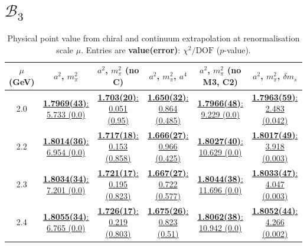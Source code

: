 \documentclass[12pt]{extarticle}
\begin{document}
\section{$\mathcal{B}_3$}
\begin{table}[h!]
\begin{center}
\begin{tabular}{|c|c|c|c|c|c|}
\hline
$\mu$ (GeV) & $a^2$, $m_\pi^2$& $a^2$, $m_\pi^2$ (no C)& $a^2$, $m_\pi^2$, $a^4$& $a^2$, $m_\pi^2$ (no M3, C2)& $a^2$, $m_\pi^2$, $\delta m_s$\\
\hline
2.0& \hyperlink{SSmPP/NPR/bag_a2m2_20.pdf.1}{\textbf{1.7969(43)}: 5.733 (0.0)} & \hyperlink{SSmPP/NPR/bag_a2m2noC_20.pdf.1}{\textbf{1.703(20)}: 0.051 (0.95)} & \hyperlink{SSmPP/NPR/bag_a2a4m2_20.pdf.1}{\textbf{1.650(32)}: 0.864 (0.485)} & \hyperlink{SSmPP/NPR/bag_a2m2mcut_20.pdf.1}{\textbf{1.7966(48)}: 9.229 (0.0)} & \hyperlink{SSmPP/NPR/bag_a2m2delm_20.pdf.1}{\textbf{1.7963(59)}: 2.483 (0.042)}\\
2.2& \hyperlink{SSmPP/NPR/bag_a2m2_22.pdf.1}{\textbf{1.8014(36)}: 6.954 (0.0)} & \hyperlink{SSmPP/NPR/bag_a2m2noC_22.pdf.1}{\textbf{1.717(18)}: 0.153 (0.858)} & \hyperlink{SSmPP/NPR/bag_a2a4m2_22.pdf.1}{\textbf{1.666(27)}: 0.966 (0.425)} & \hyperlink{SSmPP/NPR/bag_a2m2mcut_22.pdf.1}{\textbf{1.8027(40)}: 10.629 (0.0)} & \hyperlink{SSmPP/NPR/bag_a2m2delm_22.pdf.1}{\textbf{1.8017(49)}: 3.918 (0.003)}\\
2.3& \hyperlink{SSmPP/NPR/bag_a2m2_23.pdf.1}{\textbf{1.8034(34)}: 7.201 (0.0)} & \hyperlink{SSmPP/NPR/bag_a2m2noC_23.pdf.1}{\textbf{1.721(17)}: 0.195 (0.823)} & \hyperlink{SSmPP/NPR/bag_a2a4m2_23.pdf.1}{\textbf{1.667(27)}: 0.722 (0.577)} & \hyperlink{SSmPP/NPR/bag_a2m2mcut_23.pdf.1}{\textbf{1.8044(38)}: 11.696 (0.0)} & \hyperlink{SSmPP/NPR/bag_a2m2delm_23.pdf.1}{\textbf{1.8033(47)}: 4.047 (0.003)}\\
2.4& \hyperlink{SSmPP/NPR/bag_a2m2_24.pdf.1}{\textbf{1.8055(34)}: 6.765 (0.0)} & \hyperlink{SSmPP/NPR/bag_a2m2noC_24.pdf.1}{\textbf{1.726(17)}: 0.219 (0.803)} & \hyperlink{SSmPP/NPR/bag_a2a4m2_24.pdf.1}{\textbf{1.675(26)}: 0.823 (0.51)} & \hyperlink{SSmPP/NPR/bag_a2m2mcut_24.pdf.1}{\textbf{1.8062(38)}: 10.942 (0.0)} & \hyperlink{SSmPP/NPR/bag_a2m2delm_24.pdf.1}{\textbf{1.8052(44)}: 4.266 (0.002)}\\
\hline
\end{tabular}
\caption{Physical point value from chiral and continuum extrapolation at renormalisation scale $\mu$. Entries are \textbf{value(error)}: $\chi^2/\text{DOF}$ ($p$-value).}
\end{center}
\end{table}
\end{document}
